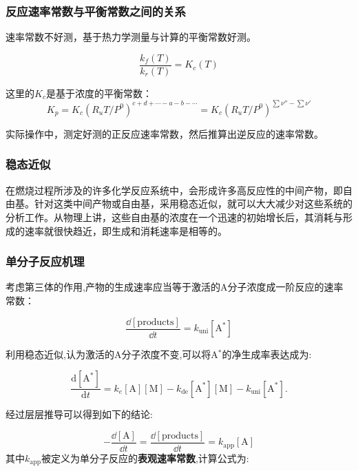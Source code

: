\subsubsection{反应速率常数与平衡常数之间的关系}
速率常数不好测，基于热力学测量与计算的平衡常数好测。

\begin{equation}
    \frac{k_f(T)}{k_r(T)} = K_c(T)
\end{equation}

这里的\(K_c\)是基于浓度的平衡常数：
\[K_p = K_c (R_u T/ P^0)^{c+d+\cdots-a-b-\cdots}=K_c (R_u T/ P^0)^{\sum \nu''-\sum \nu'}\]

实际操作中，测定好测的正反应速率常数，然后推算出逆反应的速率常数。

\subsubsection{稳态近似}
在燃烧过程所涉及的许多化学反应系统中，会形成许多高反应性的中间产物，即自由基。针对这类中间产物或自由基，采用稳态近似，就可以大大减少对这些系统的分析工作。从物理上讲，这些自由基的浓度在一个迅速的初始增长后，其消耗与形成的速率就很快趋近，即生成和消耗速率是相等的。

\subsubsection{单分子反应机理}

考虑第三体的作用,产物的生成速率应当等于激活的A分子浓度成一阶反应的速率常数：

\begin{equation}
    \frac{\dd[\mathrm{products}]}{\dd t}=k_\mathrm{uni}[\mathrm{A^*}]
\end{equation}

利用稳态近似,认为激活的A分子浓度不变,可以将A\(^*\)的净生成率表达成为:

\begin{equation}
    {\frac{\mathrm{d}[\mathrm{A}^{*}]}{\mathrm{d}t}}=k_{e}[\mathrm{A}][\mathrm{M}]-k_\mathrm{d e}[\mathrm{A}^{*}][\mathrm{M}]-k_{\mathrm{uni}}[\mathrm{A}^{*}].
\end{equation}

经过层层推导可以得到如下的结论:

\begin{equation}\label{equ:unimol_react}
    -\frac{\dd[\mathrm{A}]}{\dd t}=\frac{\dd[\mathrm{products}]}{\dd t} = k_\mathrm{app}[\mathrm{A}]
\end{equation}其中\(k_\mathrm{app}\)被定义为单分子反应的\textbf{表观速率常数},计算公式为:

